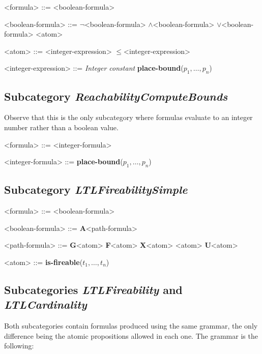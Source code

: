 \documentclass[10pt,english,a4paper]{article}
\newcommand\ctla             {\textbf{A}\xspace}
\newcommand\ltlf             {\textbf{F}\xspace}
\newcommand\ltlg             {\textbf{G}\xspace}
\newcommand\ltlx             {\textbf{X}\xspace}
\newcommand\ltlu             {\textbf{U}\xspace}
\newcommand\logicnot         {\boldmath$\lnot$\xspace}
\newcommand\logicand         {\boldmath$\land$\xspace}
\newcommand\logicor          {\boldmath$\lor$\xspace}
\newcommand\atomleq          {\boldmath$\leq$\xspace}
\newcommand\atomisfire[1]    {\textbf{is-fireable}(#1)}
\newcommand\atomplacebnd[1]  {\textbf{place-bound}(#1)}
\begin{document}
\begin{grammar}

<formula> ::= <boolean-formula>

<boolean-formula> ::=  \logicnot <boolean-formula>
 \logicand <boolean-formula>
 \logicor  <boolean-formula>
\alt <atom>

<atom> ::= <integer-expression> \atomleq <integer-expression>

<integer-expression> ::= \textit{Integer constant}
\alt \atomplacebnd{$p_1, \ldots, p_n$}

\end{grammar}

\subsection{Subcategory \textit{ReachabilityComputeBounds}}

Observe that this is the only subcategory where formulas evaluate to an
integer number rather than a boolean value.

\begin{grammar}
<formula> ::= <integer-formula>

<integer-formula> ::= \atomplacebnd{$p_1, \ldots, p_n$}
\end{grammar}


\subsection{Subcategory \textit{LTLFireabilitySimple}}

\begin{grammar}
<formula> ::= <boolean-formula>

<boolean-formula> ::= \ctla <path-formula>

<path-formula> ::=
     \ltlg <atom>
\alt \ltlf <atom>
\alt \ltlx <atom>
\alt <atom> \ltlu <atom>

<atom> ::= \atomisfire{$t_1, \ldots, t_n$}
\end{grammar}

\subsection{Subcategories \textit{LTLFireability} and \textit{LTLCardinality}}

Both subcategories contain formulas produced using the same grammar, the
only difference being the atomic propositions allowed in each one.
The grammar is the following:
\end{document}
